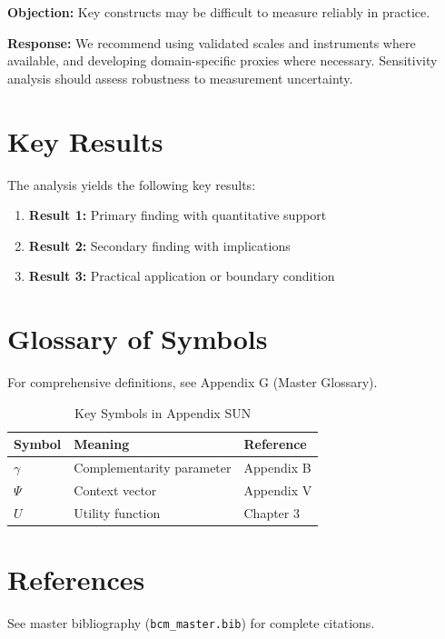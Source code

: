 \textbf{Objection:} Key constructs may be difficult to measure reliably in
practice.

\textbf{Response:} We recommend using validated scales and instruments where
available, and developing domain-specific proxies where necessary. Sensitivity
analysis should assess robustness to measurement uncertainty.





\section{Key Results}
\label{sec:sun-results}

The analysis yields the following key results:

\begin{enumerate}
    \item \textbf{Result 1:} Primary finding with quantitative support
    \item \textbf{Result 2:} Secondary finding with implications
    \item \textbf{Result 3:} Practical application or boundary condition
\end{enumerate}

\section{Glossary of Symbols}
\label{sec:sun-glossary}

For comprehensive definitions, see Appendix G (Master Glossary).

\begin{table}[htbp]
\centering
\caption{Key Symbols in Appendix SUN}
\begin{tabular}{lll}
\toprule
\textbf{Symbol} & \textbf{Meaning} & \textbf{Reference} \\
\midrule
$\gamma$ & Complementarity parameter & Appendix B \\
$\Psi$ & Context vector & Appendix V \\
$U$ & Utility function & Chapter 3 \\
\bottomrule
\end{tabular}
\end{table}


\section{References}
\label{sec:sun-references}

See master bibliography (\texttt{bcm\_master.bib}) for complete citations.

\nocite{bcm_master}

